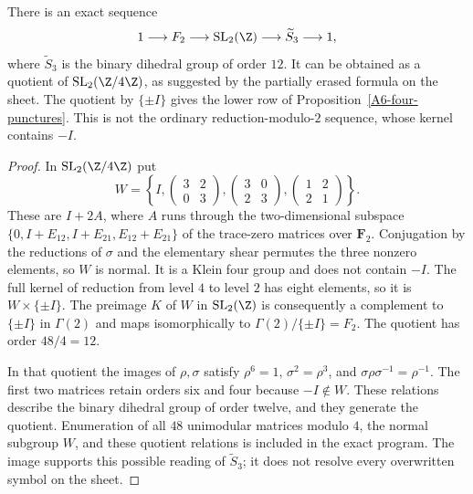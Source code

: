 \begin{proposition}\label{A6-binary-S3}
There is an exact sequence
\[
 1\longrightarrow F_2\longrightarrow\operatorname{SL}_2(\Z)
 \longrightarrow\widetilde{S}_3\longrightarrow1,
\]
where $\widetilde{S}_3$ is the binary dihedral group of order $12$. It can be obtained as a quotient of $\operatorname{SL}_2(\Z/4\Z)$, as suggested by the partially erased formula on the sheet. The quotient by $\{\pm I\}$ gives the lower row of Proposition~\ref{A6-four-punctures}. This is not the ordinary reduction-modulo-$2$ sequence, whose kernel contains $-I$.
\end{proposition}
\begin{proof}
In $\operatorname{SL}_2(\Z/4\Z)$ put
\[
 W=\left\{
 I,\begin{pmatrix}3&2\\0&3\end{pmatrix},
 \begin{pmatrix}3&0\\2&3\end{pmatrix},
 \begin{pmatrix}1&2\\2&1\end{pmatrix}\right\}.
\]
These are $I+2A$, where $A$ runs through the two-dimensional subspace
$\{0,I+E_{12},I+E_{21},E_{12}+E_{21}\}$ of the trace-zero matrices over $\mathbf F_2$. Conjugation by the reductions of $\sigma$ and the elementary shear permutes the three nonzero elements, so $W$ is normal. It is a Klein four group and does not contain $-I$. The full kernel of reduction from level $4$ to level $2$ has eight elements, so it is $W\times\{\pm I\}$. The preimage $K$ of $W$ in $\operatorname{SL}_2(\Z)$ is consequently a complement to $\{\pm I\}$ in $\Gamma(2)$ and maps isomorphically to $\Gamma(2)/\{\pm I\}=F_2$. The quotient has order $48/4=12$.

In that quotient the images of $\rho,\sigma$ satisfy
$\rho^6=1$, $\sigma^2=\rho^3$, and
$\sigma\rho\sigma^{-1}=\rho^{-1}$. The first two matrices retain orders six and four because $-I\notin W$. These relations describe the binary dihedral group of order twelve, and they generate the quotient. Enumeration of all $48$ unimodular matrices modulo $4$, the normal subgroup $W$, and these quotient relations is included in the exact program. The image supports this possible reading of $\widetilde{S}_3$; it does not resolve every overwritten symbol on the sheet.
\end{proof}

